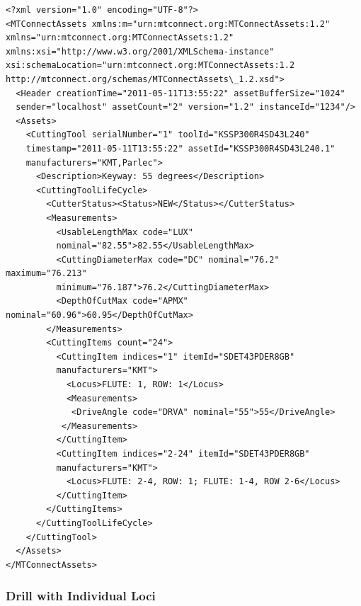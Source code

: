 \documentclass{mtconnect}	%
\begin{document}
\begin{lstlisting}[firstnumber=1,escapechar=|,% 
caption={Example for Shell Mill with Explicate Loci}, label={lst:shell-mill-with-explicate-loci}]
<?xml version="1.0" encoding="UTF-8"?>
<MTConnectAssets xmlns:m="urn:mtconnect.org:MTConnectAssets:1.2" 
xmlns="urn:mtconnect.org:MTConnectAssets:1.2" 
xmlns:xsi="http://www.w3.org/2001/XMLSchema-instance" 
xsi:schemaLocation="urn:mtconnect.org:MTConnectAssets:1.2 
http://mtconnect.org/schemas/MTConnectAssets\_1.2.xsd">
  <Header creationTime="2011-05-11T13:55:22" assetBufferSize="1024" 
  sender="localhost" assetCount="2" version="1.2" instanceId="1234"/>
  <Assets>
    <CuttingTool serialNumber="1" toolId="KSSP300R4SD43L240" 
    timestamp="2011-05-11T13:55:22" assetId="KSSP300R4SD43L240.1" 
    manufacturers="KMT,Parlec">
      <Description>Keyway: 55 degrees</Description>
      <CuttingToolLifeCycle>
        <CutterStatus><Status>NEW</Status></CutterStatus>
        <Measurements>
          <UsableLengthMax code="LUX" 
          nominal="82.55">82.55</UsableLengthMax>
          <CuttingDiameterMax code="DC" nominal="76.2" maximum="76.213" 
          minimum="76.187">76.2</CuttingDiameterMax>
          <DepthOfCutMax code="APMX" nominal="60.96">60.95</DepthOfCutMax>
        </Measurements>
        <CuttingItems count="24">
          <CuttingItem indices="1" itemId="SDET43PDER8GB" 
          manufacturers="KMT">
            <Locus>FLUTE: 1, ROW: 1</Locus>
            <Measurements>
             <DriveAngle code="DRVA" nominal="55">55</DriveAngle>
           </Measurements>
          </CuttingItem>
          <CuttingItem indices="2-24" itemId="SDET43PDER8GB" 
          manufacturers="KMT">
            <Locus>FLUTE: 2-4, ROW: 1; FLUTE: 1-4, ROW 2-6</Locus>
          </CuttingItem>
        </CuttingItems>
      </CuttingToolLifeCycle>
    </CuttingTool>
  </Assets>
</MTConnectAssets>
\end{lstlisting}

\pagebreak

\subsubsection{Drill with Individual Loci}
\end{document}
